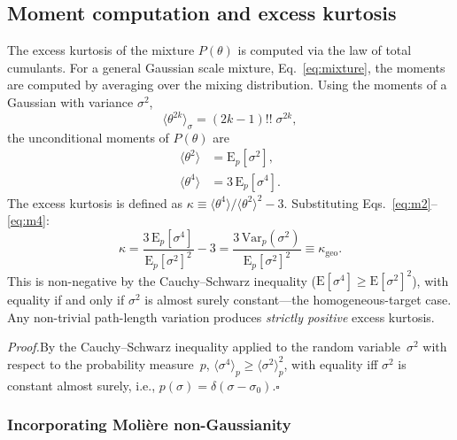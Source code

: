 \documentclass[final,5p,times,twocolumn]{elsarticle}
\begin{document}
\subsection{Moment computation and excess kurtosis}
\label{sec:moments}

The excess kurtosis of the mixture $P(\theta)$ is computed via the law of total cumulants.  For a general Gaussian scale mixture, Eq.~\eqref{eq:mixture}, the moments are computed by averaging over the mixing distribution.  Using the moments of a Gaussian with variance $\sigma^2$,
\begin{equation}
  \langle\theta^{2k}\rangle_\sigma = (2k-1)!!\;\sigma^{2k},
  \label{eq:gaussian_moments}
\end{equation}
the unconditional moments of $P(\theta)$ are
\begin{align}
  \langle\theta^2\rangle &= \mathrm{E}_p[\sigma^2], \label{eq:m2}\\
  \langle\theta^4\rangle &= 3\,\mathrm{E}_p[\sigma^4]. \label{eq:m4}
\end{align}
The excess kurtosis is defined as $\kappa \equiv \langle\theta^4\rangle/\langle\theta^2\rangle^2 - 3$.  Substituting Eqs.~\eqref{eq:m2}--\eqref{eq:m4}:
\begin{equation}
  \boxed{\kappa = \frac{3\,\mathrm{E}_p[\sigma^4]}{\mathrm{E}_p[\sigma^2]^2} - 3 = \frac{3\,\mathrm{Var}_p(\sigma^2)}{\mathrm{E}_p[\sigma^2]^2} \equiv \kappa_{\mathrm{geo}}.}
  \label{eq:kappa_geo}
\end{equation}
This is non-negative by the Cauchy--Schwarz inequality ($\mathrm{E}[\sigma^4]\geq\mathrm{E}[\sigma^2]^2$), with equality if and only if $\sigma^2$ is almost surely constant---the homogeneous-target case.  Any non-trivial path-length variation produces \emph{strictly positive} excess kurtosis.

\emph{Proof.}\quad By the Cauchy--Schwarz inequality applied to the random variable~$\sigma^2$ with respect to the probability measure~$p$, $\langle\sigma^4\rangle_p \geq \langle\sigma^2\rangle_p^2$, with equality iff $\sigma^2$ is constant almost surely, i.e., $p(\sigma)=\delta(\sigma-\sigma_0)$.\quad$\square$

\subsubsection*{Incorporating Moli\`{e}re non-Gaussianity}
\end{document}
